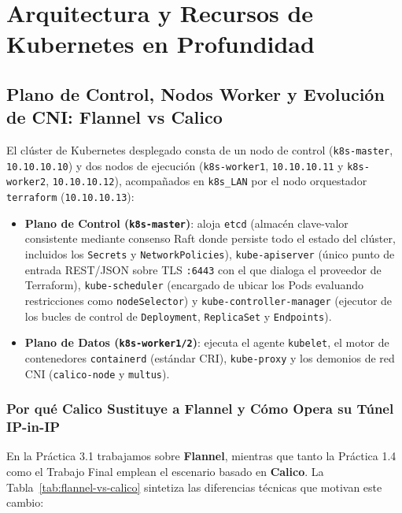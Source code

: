 \chapter{Arquitectura y Recursos de Kubernetes en Profundidad}

\section{Plano de Control, Nodos Worker y Evolución de CNI: Flannel vs Calico}

El clúster de Kubernetes desplegado consta de un nodo de control (\texttt{k8s-master}, \texttt{10.10.10.10}) y dos nodos de ejecución (\texttt{k8s-worker1}, \texttt{10.10.10.11} y \texttt{k8s-worker2}, \texttt{10.10.10.12}), acompañados en \texttt{k8s\_LAN} por el nodo orquestador \texttt{terraform} (\texttt{10.10.10.13}):
\begin{itemize}
  \item \textbf{Plano de Control (\texttt{k8s-master})}: aloja \texttt{etcd} (almacén clave-valor consistente mediante consenso Raft donde persiste todo el estado del clúster, incluidos los \texttt{Secrets} y \texttt{NetworkPolicies}), \texttt{kube-apiserver} (único punto de entrada REST/JSON sobre TLS \texttt{:6443} con el que dialoga el proveedor de Terraform), \texttt{kube-scheduler} (encargado de ubicar los Pods evaluando restricciones como \texttt{nodeSelector}) y \texttt{kube-controller-manager} (ejecutor de los bucles de control de \texttt{Deployment}, \texttt{ReplicaSet} y \texttt{Endpoints}).
  \item \textbf{Plano de Datos (\texttt{k8s-worker1/2})}: ejecuta el agente \texttt{kubelet}, el motor de contenedores \texttt{containerd} (estándar CRI), \texttt{kube-proxy} y los demonios de red CNI (\texttt{calico-node} y \texttt{multus}).
\end{itemize}

\subsection{Por qué Calico Sustituye a Flannel y Cómo Opera su Túnel IP-in-IP}

En la Práctica 3.1 trabajamos sobre \textbf{Flannel}, mientras que tanto la Práctica 1.4 como el Trabajo Final emplean el escenario  basado en \textbf{Calico}. La Tabla~\ref{tab:flannel-vs-calico} sintetiza las diferencias técnicas que motivan este cambio:

